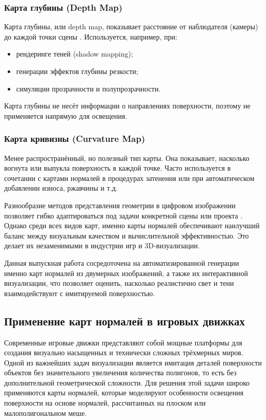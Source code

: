 \subsubsection{Карта глубины (Depth Map)}

Карта глубины, или depth map, показывает расстояние от наблюдателя (камеры) до каждой точки сцены \cite{distante2020}. Используется, например, при:
\begin{itemize}
	\item рендеринге теней (shadow mapping);
	\item генерации эффектов глубины резкости;
	\item симуляции прозрачности и полупрозрачности.
\end{itemize}

Карта глубины не несёт информации о направлениях поверхности, поэтому не применяется напрямую для освещения.
\subsubsection{Карта кривизны (Curvature Map)}

Менее распространённый, но полезный тип карты. Она показывает, насколько вогнута или выпукла поверхность в каждой точке. Часто используется в сочетании с картами нормалей в процедурах затенения или при автоматическом добавлении износа, ржавчины и т.д.

Разнообразие методов представления геометрии в цифровом изображении позволяет гибко адаптироваться под задачи конкретной сцены или проекта \cite{ansari2024}. Однако среди всех видов карт, именно карты нормалей обеспечивают наилучший баланс между визуальным качеством и вычислительной эффективностью. Это делает их незаменимыми в индустрии игр и 3D-визуализации.

Данная выпускная работа сосредоточена на автоматизированной генерации именно карт нормалей из двумерных изображений, а также их интерактивной визуализации, что позволяет оценить, насколько реалистично свет и тени взаимодействуют с имитируемой поверхностью. 
\subsection{Применение карт нормалей в игровых движках}

Современные игровые движки представляют собой мощные платформы для создания визуально насыщенных и технически сложных трёхмерных миров. Одной из важнейших задач визуализации является имитация деталей поверхности объектов без значительного увеличения количества полигонов, то есть без дополнительной геометрической сложности. Для решения этой задачи широко применяются карты нормалей, которые моделируют особенности освещения поверхности на основе нормалей, рассчитанных на плоском или малополигональном меше.

